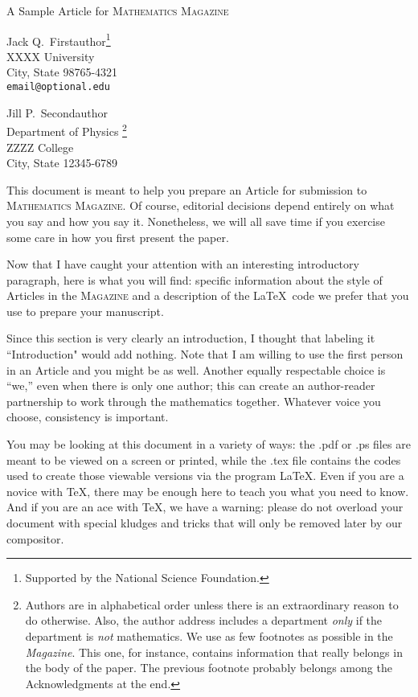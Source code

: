 \documentclass[12pt]{article}
\begin{document}
\begin{center}
\Large
A Sample Article for  \textsc{ Mathematics Magazine}
\end{center}

\begin{flushright}
Jack Q.~Firstauthor\footnote{Supported by the National Science
Foundation.}  \\
XXXX University \\
City, State 98765-4321\\
\verb+email@optional.edu+

\vspace{2 mm}

Jill P.~Secondauthor \\
Department of Physics
\footnote{Authors are in alphabetical order
unless there is an extraordinary reason to do otherwise.  Also,
the author address includes a department \emph{only} if
the department is \emph{not} mathematics. We use as few
footnotes as possible in the \textit{Magazine}.  This one, for instance,
contains information that really belongs in the body of the paper.
The previous footnote probably belongs among the Acknowledgments at the end.}\\
ZZZZ College \\
City, State 12345-6789
\end{flushright}

This document is meant to help you prepare an Article for
submission to \textsc{Mathematics Magazine}.  Of course,
editorial decisions depend entirely on
what you say and how you say it. Nonetheless, we will all save
time if you exercise some care in how you first present the paper.

Now that I have caught your attention with an interesting introductory paragraph,
here is what you will find:
specific information about the style of Articles in the \textsc{Magazine}
and a description of the \LaTeX\ code we prefer that you use
to prepare your manuscript.

Since this section is very clearly
an introduction, I thought that labeling it ``Introduction" would add
nothing.  Note that I am willing to use the first person in an Article
and you might be as well.  Another equally respectable choice is ``we,''
even when there is only one author; this can
create an author-reader partnership to
work through the mathematics together.
Whatever voice you choose, consistency is important.

You may be looking at this document in a variety of ways:  the .pdf or .ps files
are meant to be viewed on a screen or printed, while
the .tex file contains the codes used to create those
viewable versions via the program \LaTeX.  Even if you are a novice with \TeX,
there may be enough here to teach you what
you need to know.  And if you are an ace with \TeX,
we have a warning: please do not overload your
document with special kludges and tricks that will
only be removed later by our compositor.
\end{document}
